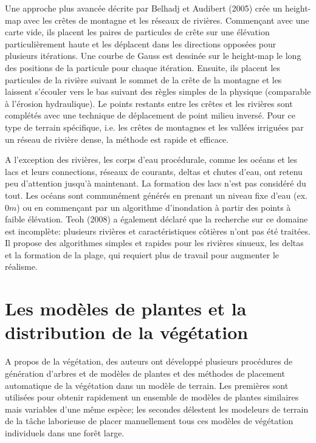 \documentclass[11pt]{report}
\begin{document}
Une approche plus avancée décrite par Belhadj et Audibert (2005) crée un height-map avec les crêtes de montagne et les réseaux de rivières. Commençant avec une carte vide, ils placent les paires de particules de crête sur une élévation particulièrement haute et les déplacent dans les directions opposées pour plusieurs itérations. Une courbe de Gauss est dessinée sur le height-map le long des positions de la particule pour chaque itération. Ensuite, ils placent les particules de la rivière suivant le sommet de la crête de la montagne et les laissent s'écouler vers le bas suivant des règles simples de la physique (comparable à l'érosion hydraulique). Le points restants entre les crêtes et les rivières sont complétés avec une technique de déplacement de point milieu inversé. Pour ce type de terrain spécifique, i.e. les crêtes de montagnes et les vallées irriguées par un réseau de rivière dense, la méthode est rapide et efficace. \newline
 
 A l'exception des rivières, les corps d'eau procédurale, comme les océans et les lacs et leurs connections, réseaux de courants, deltas et chutes d'eau, ont retenu peu d'attention jusqu'à maintenant. La formation des lacs n'est pas considéré du tout. Les océans sont communément générés en  prenant un niveau fixe d'eau (ex. $0m$) ou en commençant par un algorithme d'inondation à partir des points à faible élévation. Teoh (2008) a également déclaré que la recherche sur ce domaine est incomplète: plusieurs rivières et caractéristiques côtières n'ont pas été traitées. Il propose des algorithmes simples et rapides pour les rivières sinueux, les deltas et la formation de la plage, qui requiert plus de travail pour augmenter le réalisme.
 
\section{Les modèles de plantes et la distribution de la végétation}

A propos de la végétation, des auteurs ont développé plusieurs procédures de génération d'arbres et de modèles de plantes et des méthodes de placement automatique de la végétation dans un modèle de terrain. Les premières sont utilisées pour obtenir rapidement un ensemble de modèles de plantes similaires mais variables d'une même espèce; les secondes délestent les modeleurs de terrain de la tâche laborieuse de placer manuellement tous ces modèles de végétation individuels dans une forêt large. \newline
\end{document}
